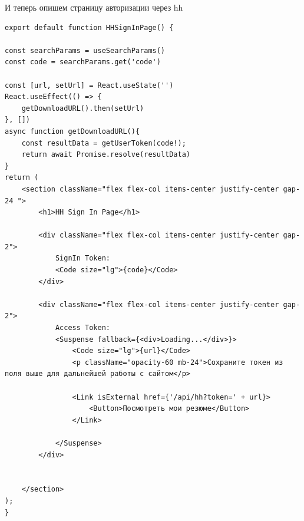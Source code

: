 \documentclass[master, och, pract]{SCWorks}
\begin{document}
И теперь опишем страницу авторизации через hh
\begin{verbatim}
export default function HHSignInPage() {

const searchParams = useSearchParams()
const code = searchParams.get('code')

const [url, setUrl] = React.useState('')
React.useEffect(() => {
    getDownloadURL().then(setUrl)
}, [])
async function getDownloadURL(){
    const resultData = getUserToken(code!);
    return await Promise.resolve(resultData)
}
return (
    <section className="flex flex-col items-center justify-center gap-24 ">
        <h1>HH Sign In Page</h1>

        <div className="flex flex-col items-center justify-center gap-2">
            SignIn Token:
            <Code size="lg">{code}</Code>
        </div>
        
        <div className="flex flex-col items-center justify-center gap-2">
            Access Token:
            <Suspense fallback={<div>Loading...</div>}>
                <Code size="lg">{url}</Code>
                <p className="opacity-60 mb-24">Сохраните токен из поля выше для дальнейшей работы с сайтом</p>

                <Link isExternal href={'/api/hh?token=' + url}>
                    <Button>Посмотреть мои резюме</Button>
                </Link>

            </Suspense>
        </div>

    
    </section>
);
}   
\end{verbatim}
\end{document}
